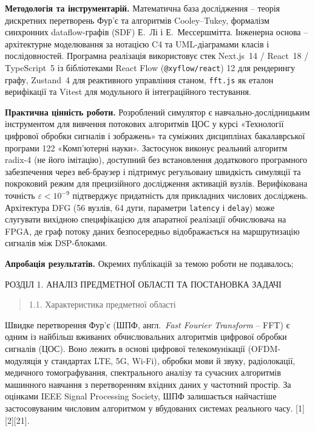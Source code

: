 \documentclass[
]{article}
\begin{document}
\textbf{Методологія та інструментарій.} Математична база дослідження --
теорія дискретних перетворень Фур'є та алгоритмів Cooley--Tukey,
формалізм синхронних dataflow-графів (SDF) Е.~Лі і Е.~Мессершмітта.
Інженерна основа -- архітектурне моделювання за нотацією C4 та
UML-діаграмами класів і послідовностей. Програмна реалізація
використовує стек Next.js~14 / React~18 / TypeScript~5 із бібліотеками
React Flow (\texttt{@xyflow/react}) 12 для рендерингу графу, Zustand~4
для реактивного управління станом, \texttt{fft.js} як еталон верифікації
та Vitest для модульного й інтеграційного тестування.

\textbf{Практична цінність роботи.} Розроблений симулятор є
навчально-дослідницьким інструментом для вивчення потокових алгоритмів
ЦОС у курсі «Технології цифрової обробки сигналів і зображень» та
суміжних дисциплінах бакалаврської програми 122 «Комп'ютерні науки».
Застосунок виконує реальний алгоритм radix-4 (не його імітацію),
доступний без встановлення додаткового програмного забезпечення через
веб-браузер і підтримує регульовану швидкість симуляції та покроковий
режим для прецизійного дослідження активацій вузлів. Верифікована
точність \(\varepsilon < 10^{- 9}\) підтверджує придатність для
прикладних числових досліджень. Архітектура DFG (56 вузлів, 64 дуги,
параметри \texttt{latency} і \texttt{delay}) може слугувати вихідною
специфікацією для апаратної реалізації обчислювача на FPGA, де граф
потоку даних безпосередньо відображається на маршрутизацію сигналів між
DSP-блоками.

\textbf{Апробація результатів.} Окремих публікацій за темою роботи не
подавалось;

\protect{}\label{_Toc230379707}{}РОЗДІЛ 1. АНАЛІЗ
ПРЕДМЕТНОЇ ОБЛАСТІ ТА ПОСТАНОВКА ЗАДАЧІ

\begin{quote}
\protect{}\label{ux445ux430ux440ux430ux43aux442ux435ux440ux438ux441ux442ux438ux43aux430-ux43fux440ux435ux434ux43cux435ux442ux43dux43eux457-ux43eux431ux43bux430ux441ux442ux456}{}1.1.
Характеристика предметної області
\end{quote}

Швидке перетворення Фур'є (ШПФ, англ.~\emph{Fast Fourier Transform} --
FFT) є одним із найбільш вживаних обчислювальних алгоритмів цифрової
обробки сигналів (ЦОС). Воно лежить в основі цифрової телекомунікації
(OFDM-модуляція у стандартах LTE, 5G, Wi-Fi), обробки мови й звуку,
радіолокації, медичного томографування, спектрального аналізу та
сучасних алгоритмів машинного навчання з перетворенням вхідних даних у
частотний простір. За оцінками IEEE Signal Processing Society, ШПФ
залишається найчастіше застосовуваним числовим алгоритмом у вбудованих
системах реального часу. {[}1{]}{[}2{]}{[}21{]}.
\end{document}
